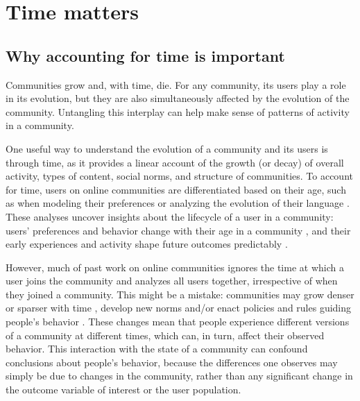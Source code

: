 \section{Time matters} 
\subsection{Why accounting for time is important}

Communities grow and, with time, die. For any community, its users play a role in its evolution, but they are also simultaneously affected by the evolution of the community. Untangling this interplay can help make sense of patterns of activity in a community.

One useful way to understand the evolution of a community and its users is through time, as it provides a linear account of the growth (or decay) of overall activity, types of content, social norms, and structure of communities. To account for time, users on online communities are differentiated based on their age, such as when modeling their preferences \cite{McAuley2013} or analyzing the evolution of their language \cite{Danescu-niculescu-mizil2013}. These analyses uncover insights about the lifecycle of a user in a community: users' preferences and behavior change with their age in a community \cite{Panciera2010}, and their early experiences and activity shape future outcomes predictably \cite{Tan2015,Yang2009,Panciera2009, Miller2015}. 

However, much of past work on online communities ignores the time at which a user joins the community and analyzes all users together, irrespective of when they joined a community. 
This might be a mistake: communities may grow denser or sparser with time \cite{Leskovec2005}, develop new norms \cite{Kooti2010} and/or enact policies and rules guiding people's behavior \cite{Butler2008}.
These changes mean that people experience different versions of a community at different times, which can, in turn, affect their observed behavior. This interaction with the state of a community can confound conclusions about people's behavior, because the differences one observes may simply be due to changes in the community, rather than any significant change in the outcome variable of interest or the user population.  



